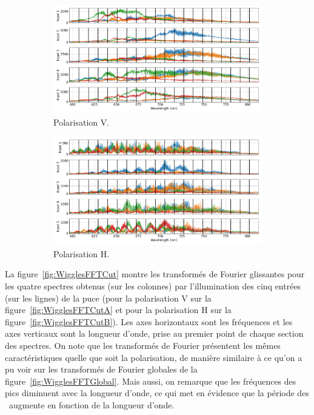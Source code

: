 \begin{figure}[ht!]
    \centering
    \begin{subfigure}{0.8\textwidth}
        \centering
        \includegraphics[width=\textwidth]{Figure_Chap4/20220811_P2VM_01_Flat1_SpectraCut_VS_Wave_Pola1_Base.png}
        \caption{Polarisation V.}
        \label{fig:WigglesSpectraCutA}
    \end{subfigure}
    \begin{subfigure}{0.8\textwidth}
        \centering
        \includegraphics[width=\textwidth]{Figure_Chap4/20220811_P2VM_01_Flat1_SpectraCut_VS_Wave_Pola2_Base.png}
        \caption{Polarisation H.}
        \label{fig:WigglesSpectraCutB}
    \end{subfigure}
    \caption[]{}
    \label{fig:WigglesSpectraCut}
\end{figure}

La figure~\ref{fig:WigglesFFTCut} montre les transformés de Fourier glissantes pour les quatre spectres obtenus (sur les colonnes) par l'illumination des cinq entrées (sur les lignes) de la puce (pour la polarisation V sur la figure~\ref{fig:WigglesFFTCutA} et pour la polarisation H sur la figure~\ref{fig:WigglesFFTCutB}). Les axes horizontaux sont les fréquences et les axes verticaux sont la longueur d'onde, prise au premier point de chaque section des spectres. On note que les transformés de Fourier présentent les mêmes caractéristiques quelle que soit la polarisation, de manière similaire à ce qu'on a pu voir sur les transformés de Fourier globales de la figure~\ref{fig:WigglesFFTGlobal}. Mais aussi, on remarque que les fréquences des pics diminuent avec la longueur d'onde, ce qui met en évidence que la période des \wiggles~augmente en fonction de la longueur d'onde.

